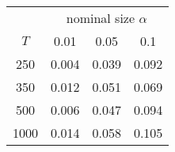 % 
\begin{tabular}{cccc}
  \hline
  & \multicolumn{3}{c}{nominal size $\alpha$} \\
 $T$ & 0.01 & 0.05 & 0.1 \\
 \hline
250 & 0.004 & 0.039 & 0.092 \\ 
  350 & 0.012 & 0.051 & 0.069 \\ 
  500 & 0.006 & 0.047 & 0.094 \\ 
  1000 & 0.014 & 0.058 & 0.105 \\ 
   \hline
\end{tabular}
